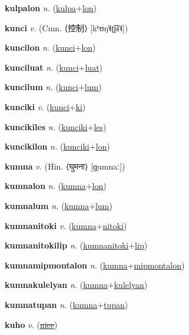 \textbf{\hypertarget{kulpalon}{kulpalon}} \textit{n.} (\hyperlink{kulpa}{kulpa}+\allowbreak \hyperlink{lon}{lon})


\textbf{\hypertarget{kunci}{kunci}} \textit{v.} (Cmn. ⟨{\chinese{}控制}⟩ [kʰʊŋ˥˩ʈ͡ʂɨ˥˩])


\textbf{\hypertarget{kuncilon}{kuncilon}} \textit{n.} (\hyperlink{kunci}{kunci}+\allowbreak \hyperlink{lon}{lon})


\textbf{\hypertarget{kunciluat}{kunciluat}} \textit{n.} (\hyperlink{kunci}{kunci}+\allowbreak \hyperlink{luat}{luat})


\textbf{\hypertarget{kuncilum}{kuncilum}} \textit{n.} (\hyperlink{kunci}{kunci}+\allowbreak \hyperlink{lum}{lum})


\textbf{\hypertarget{kunciki}{kunciki}} \textit{v.} (\hyperlink{kunci}{kunci}+\allowbreak \hyperlink{ki}{ki})


\textbf{\hypertarget{kuncikiles}{kuncikiles}} \textit{n.} (\hyperlink{kunciki}{kunciki}+\allowbreak \hyperlink{les}{les})


\textbf{\hypertarget{kuncikilon}{kuncikilon}} \textit{n.} (\hyperlink{kunciki}{kunciki}+\allowbreak \hyperlink{lon}{lon})


\textbf{\hypertarget{kumna}{kumna}} \textit{v.} (Hin. ⟨{\devanagari{}घुमना}⟩ [ɡ̤umnaː])


\textbf{\hypertarget{kumnalon}{kumnalon}} \textit{n.} (\hyperlink{kumna}{kumna}+\allowbreak \hyperlink{lon}{lon})


\textbf{\hypertarget{kumnalum}{kumnalum}} \textit{n.} (\hyperlink{kumna}{kumna}+\allowbreak \hyperlink{lum}{lum})


\textbf{\hypertarget{kumnanitoki}{kumnanitoki}} \textit{v.} (\hyperlink{kumna}{kumna}+\allowbreak \hyperlink{nitoki}{nitoki})


\textbf{\hypertarget{kumnanitokilip}{kumnanitokilip}} \textit{n.} (\hyperlink{kumnanitoki}{kumnanitoki}+\allowbreak \hyperlink{lip}{lip})


\textbf{\hypertarget{kumnamipmontalon}{kumnamipmontalon}} \textit{n.} (\hyperlink{kumna}{kumna}+\allowbreak \hyperlink{mipmontalon}{mipmontalon})


\textbf{\hypertarget{kumnakulelyan}{kumnakulelyan}} \textit{n.} (\hyperlink{kumna}{kumna}+\allowbreak \hyperlink{kulelyan}{kulelyan})


\textbf{\hypertarget{kumnatupan}{kumnatupan}} \textit{n.} (\hyperlink{kumna}{kumna}+\allowbreak \hyperlink{tupan}{tupan})


\textbf{\hypertarget{kuho}{kuho}} \textit{v.} (\hyperlink{nice}{\sout{nice}})


